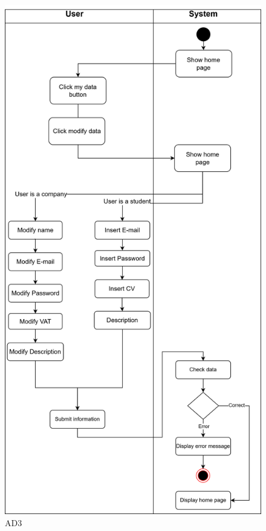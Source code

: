 \begin{figure}[H]
    \centering
    \includegraphics[width=0.7\linewidth]{Images/UseCasesDiagrams-manage-data.png}
    \caption{AD3}
    \label{AD3}
\end{figure}

